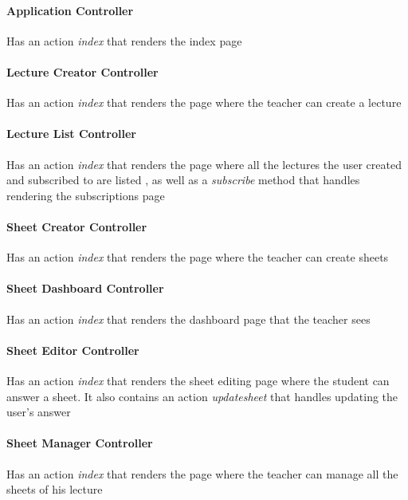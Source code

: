 \paragraph{Application Controller}  Has an action \textit{index} that renders the index page
\paragraph{Lecture Creator Controller} Has an action \textit{index} that renders the page where the teacher can create a lecture
\paragraph{Lecture List Controller} Has an action \textit{index} that renders the page where all the lectures the user created and subscribed to are listed , as well as a \textit{subscribe} method that handles rendering the subscriptions page
\paragraph{Sheet Creator Controller} Has an action \textit{index} that renders the page where the teacher can create sheets
\paragraph{Sheet Dashboard Controller} Has an action \textit{index} that renders the dashboard page that the teacher sees
\paragraph{Sheet Editor Controller} Has an action \textit{index} that renders the sheet editing page where the student can answer a sheet. It also contains an action \textit{update\textunderscore sheet}  that handles updating the user's answer
\paragraph{Sheet Manager Controller} Has an action \textit{index} that renders the page where the teacher can manage all the sheets of his lecture
